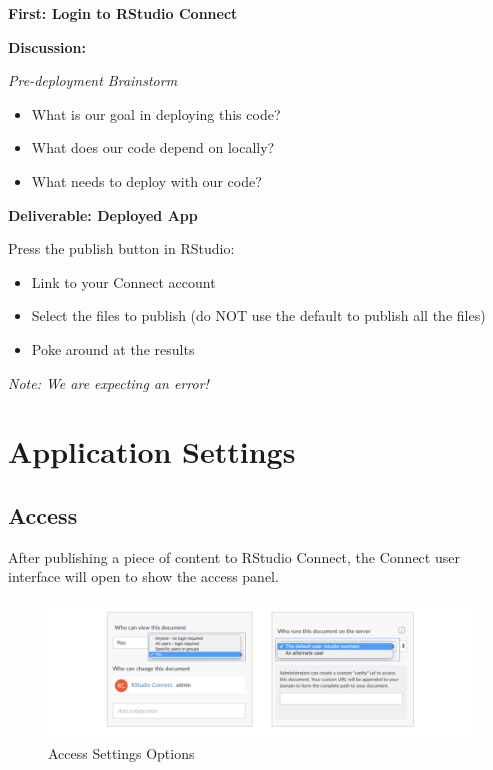 \documentclass[]{book}
\providecommand{\tightlist}{%
  \setlength{\itemsep}{0pt}\setlength{\parskip}{0pt}}
\theoremstyle{definition}
\theoremstyle{definition}
\theoremstyle{definition}
\theoremstyle{remark}
\begin{document}
\textbf{First: Login to RStudio Connect}

\textbf{Discussion:}

\emph{Pre-deployment Brainstorm}

\begin{itemize}
\tightlist
\item
  What is our goal in deploying this code?
\item
  What does our code depend on locally?
\item
  What needs to deploy with our code?
\end{itemize}

\textbf{Deliverable: Deployed App}

Press the publish button in RStudio:

\begin{itemize}
\tightlist
\item
  Link to your Connect account
\item
  Select the files to publish (do NOT use the default to publish all the
  files)
\item
  Poke around at the results
\end{itemize}

\emph{Note: We are expecting an error!}

\hypertarget{application-settings}{%
\section{Application Settings}\label{application-settings}}

\hypertarget{access}{%
\subsection{Access}\label{access}}

After publishing a piece of content to RStudio Connect, the Connect user
interface will open to show the access panel.

\begin{figure}
\centering
\includegraphics{imgs/deployment/access-settings.png}
\caption{Access Settings Options}
\end{figure}
\end{document}
